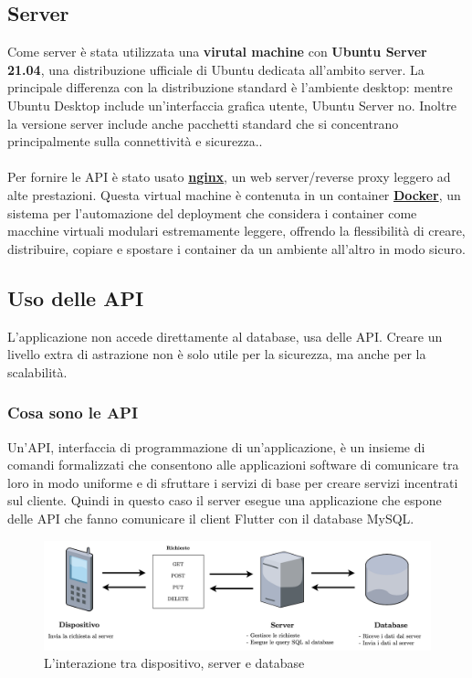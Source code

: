 \subsection{Server}
Come server è stata utilizzata una \textbf{virutal machine} con \textbf{Ubuntu Server 21.04}, una distribuzione ufficiale di Ubuntu dedicata all'ambito server. La principale differenza con la distribuzione standard è l'ambiente desktop: mentre Ubuntu Desktop include un'interfaccia grafica utente, Ubuntu Server no. Inoltre la versione server include anche pacchetti standard che si concentrano principalmente sulla connettività e sicurezza.\cite{ubuntu_server_guide}.\\\\Per fornire le API è stato usato \textbf{\href{https://www.nginx.com/}{nginx}}, un web server/reverse proxy leggero ad alte prestazioni. Questa virtual machine è contenuta in un container \textbf{\href{https://www.docker.com/}{Docker}}, un sistema per l'automazione del deployment che considera i container come macchine virtuali modulari estremamente leggere, offrendo la flessibilità di creare, distribuire, copiare e spostare i container da un ambiente all'altro in modo sicuro.\cite{docker_guide}

\clearpage

\subsection{Uso delle API}
L'applicazione non accede direttamente al database, usa delle API. Creare un livello extra di astrazione non è solo utile per la sicurezza, ma anche per la scalabilità. 
\subsubsection{Cosa sono le API}
Un'API, interfaccia di programmazione di un’applicazione, è un insieme di comandi formalizzati che consentono alle applicazioni software di comunicare tra loro in modo uniforme e di sfruttare i servizi di base per creare servizi incentrati sul cliente. Quindi in questo caso il server esegue una applicazione che espone delle API che fanno comunicare il client Flutter con il database MySQL. 

\begin{center}
\begin{figure}[htp]
    \centering
    \includegraphics[width=12cm]{diagrams/diagramma_backend.png}
    \caption{L'interazione tra dispositivo, server e database}
    \label{fig:interazione_backend}
\end{figure}
\end{center}


